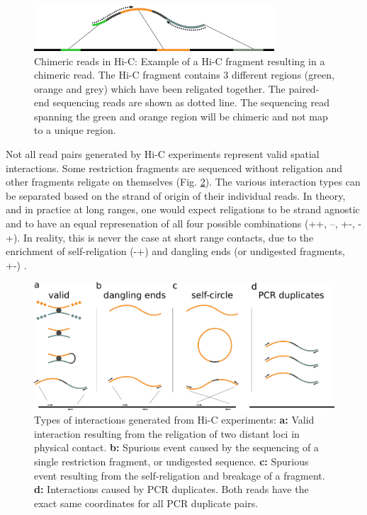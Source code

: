 \begin{figure}[htb]
    \includegraphics[width=0.8\textwidth]{Parts/Part02/gfx/hicstuff/chimeric.pdf}
    \caption[Chimeric reads in Hi-C.]{Chimeric reads in Hi-C: Example of a Hi-C fragment resulting in a chimeric read. The Hi-C fragment contains 3 different regions (green, orange and grey) which have been religated together. The paired-end sequencing reads are shown as dotted line. The sequencing read spanning the green and orange region will be chimeric and not map to a unique region.}
    \label{fig:02-01:chimeric}
\end{figure}

Not all read pairs generated by Hi-C experiments represent valid spatial interactions. Some restriction fragments are sequenced without religation and other fragments religate on themselves (Fig. \ref{fig:02-01:filters}). The various interaction types can be separated based on the strand of origin of their individual reads. In theory, and in practice at long ranges, one would expect religations to be strand agnostic and to have an equal represenation of all four possible combinations (++, --, +-, -+). In reality, this is never the case at short range contacts, due to the enrichment of self-religation (-+) and dangling ends (or undigested fragments, +-) \cite{cournacNormalizationChromosomalContact2012}.

\begin{figure}[htb]
    \includegraphics[width=\textwidth]{Parts/Part02/gfx/hicstuff/filters.pdf}
    \caption[Types of interactions generated from Hi-C experiments.]{Types of interactions generated from Hi-C experiments: \textbf{a:} Valid interaction resulting from the religation of two distant loci in physical contact. \textbf{b:} Spurious event caused by the sequencing of a single restriction fragment, or undigested sequence. \textbf{c:} Spurious event resulting from the self-religation and breakage of a fragment. \textbf{d:} Interactions caused by PCR duplicates. Both reads have the exact same coordinates for all PCR duplicate pairs.}
    \label{fig:02-01:filters}
\end{figure}


